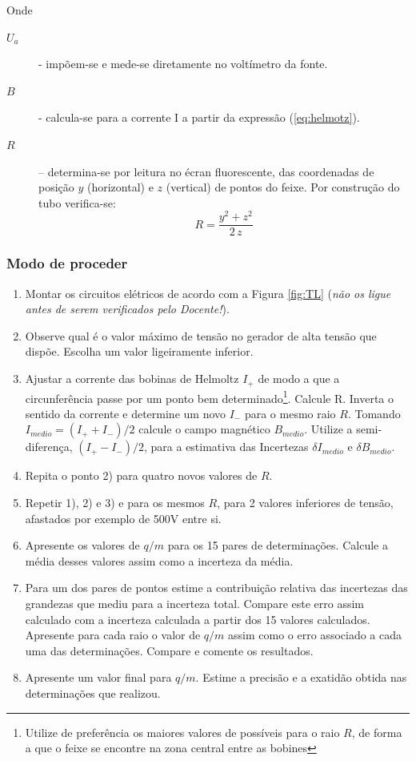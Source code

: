 \documentclass[a4paper,twoside,12pt]{article}      %
\begin{document}
Onde
\begin{description}
\item[$U_a$] - impõem-se e mede-se diretamente no voltímetro da fonte.
\item[$B$] - calcula-se para a corrente I a partir da expressão (\ref{eq:helmotz}).
\item[$R$] – determina-se por leitura no écran fluorescente, das coordenadas de posição $y$ (horizontal) e $z$ (vertical) de pontos do feixe. Por construção do tubo verifica-se:
\begin{equation}
	\label{eq:eR}
 R = \frac{y^2 + z^2}{2 \, z} 
\end{equation}
\end{description}



\subsubsection{\sf Modo de proceder}


\begin{enumerate}
	\item Montar os circuitos elétricos de acordo com a  Figura \ref{fig:TL} 
	(\emph{não os ligue antes de serem verificados pelo Docente!}).
	\item Observe qual é o valor máximo de tensão no gerador de  alta tensão que dispõe. Escolha um valor ligeiramente inferior.
	\item Ajustar a corrente das bobinas de Helmoltz $I_+$ de modo a que a circunferência passe por um ponto bem determinado\footnote{Utilize de preferência os maiores valores de possíveis para o raio $R$, de forma a que o feixe se encontre na zona central entre as bobines}.  Calcule R.
	Inverta o sentido da corrente e determine um novo $I_-$ para o mesmo raio $R$.
	Tomando $I_{medio} = (I_+ + I_-)/2 $ calcule o campo magnético $B_{medio}$. Utilize a semi-diferença, $(I_+ - I_-)/2$, para a estimativa das Incertezas $\delta I_{medio}$ e $\delta B_{medio}$.
	\item Repita o ponto 2) para quatro novos valores de $R$. 
	\item Repetir 1), 2) e 3)  e para os mesmos $R$, para 2 valores inferiores de tensão, afastados por exemplo de 500V entre si.
	\item Apresente os valores de $q/m$ para os 15 pares de determinações. Calcule a média desses valores assim como a incerteza da média.
	\item Para um dos pares de pontos estime a contribuição relativa das incertezas das grandezas que mediu para a incerteza total. Compare este erro assim calculado com a incerteza calculada a partir dos 15 valores calculados.
	Apresente para cada raio o valor de $q/m$ assim como o erro associado a cada uma das determinações. Compare e comente os resultados.
	\item Apresente um valor final para $q/m$. Estime a precisão e a exatidão obtida nas determinações que realizou.
\end{enumerate}
 
\end{document}
